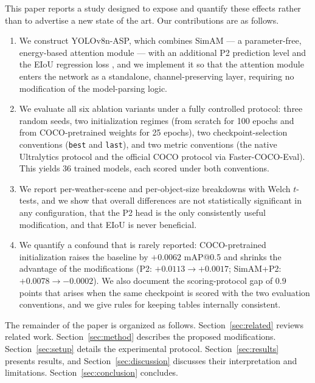 \documentclass[pdflatex,sn-basic,Numbered]{sn-jnl}%
\begin{document}
This paper reports a study designed to expose and quantify these effects rather than to advertise a new state of the art. Our contributions are as follows.

\begin{enumerate}
\item We construct YOLOv8n-ASP, which combines SimAM \cite{yang2021simam} --- a parameter-free, energy-based attention module --- with an additional P2 prediction level and the EIoU regression loss \cite{zhang2022eiou}, and we implement it so that the attention module enters the network as a standalone, channel-preserving layer, requiring no modification of the model-parsing logic.

\item We evaluate all six ablation variants under a fully controlled protocol: three random seeds, two initialization regimes (from scratch for 100 epochs and from COCO-pretrained weights for 25 epochs), two checkpoint-selection conventions (\texttt{best} and \texttt{last}), and two metric conventions (the native Ultralytics protocol and the official COCO protocol via Faster-COCO-Eval). This yields 36 trained models, each scored under both conventions.

\item We report per-weather-scene and per-object-size breakdowns with Welch $t$-tests, and we show that overall differences are not statistically significant in any configuration, that the P2 head is the only consistently useful modification, and that EIoU is never beneficial.

\item We quantify a confound that is rarely reported: COCO-pretrained initialization raises the baseline by $+0.0062$ mAP@0.5 and shrinks the advantage of the modifications (P2: $+0.0113 \rightarrow +0.0017$; SimAM+P2: $+0.0078 \rightarrow -0.0002$). We also document the scoring-protocol gap of $0.9$ points that arises when the same checkpoint is scored with the two evaluation conventions, and we give rules for keeping tables internally consistent.
\end{enumerate}

The remainder of the paper is organized as follows. Section~\ref{sec:related} reviews related work. Section~\ref{sec:method} describes the proposed modifications. Section~\ref{sec:setup} details the experimental protocol. Section~\ref{sec:results} presents results, and Section~\ref{sec:discussion} discusses their interpretation and limitations. Section~\ref{sec:conclusion} concludes.
\end{document}
